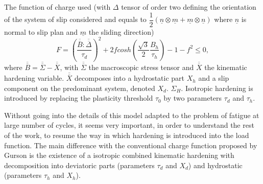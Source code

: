 The function of charge used (with $\Delta$ tensor of order two defining the orientation of the system of slip considered and equals to 
$\dfrac{1}{2}\left(\underline{n}\otimes\underline{m}+\underline{m}\otimes\underline{n} \right)  $ where $\underline{n}$ is normal to slip plan and $\underline{m}$ the sliding direction)
\begin{equation}
F=\left( \dfrac{\overline{\overline{B}}:\overline{\overline{\Delta}}}{\tau_d}\right) ^2+2fcosh\left(\dfrac{\sqrt{3}}{2}\dfrac{B_h}{\tau_h}\right)-1-f^2\leqslant 0 ,
\label{eq.monchiet1}
\end{equation}
where $\overline{\overline{B}}=\overline{\overline{\Sigma}}-\overline{\overline{X}}$, with $\overline{\overline{\Sigma}}$ the macroscopic stress tensor and $\overline{\overline{X}}$ the  kinematic hardening variable. $\overline{\overline{X}}$  decomposes into a hydrostatic part $X_h$ and a slip component on the predominant system, denoted $X_d$. $\Sigma_H$. Isotropic hardening is introduced by replacing the plasticity threshold $\tau_0$ by two parameters $\tau_d$ and $\tau_h$.

Without going into the details of this model adapted to the problem of fatigue at large number of cycles, it seems very important, in order to understand the rest of the work, to resume the way in which hardening is introduced into the load function. The main difference with the conventional charge function proposed by Gurson is the existence of a isotropic combined kinematic hardening with decomposition into deviatoric parts (parameters $\tau_d$ and $X_d$) and hydrostatic (parameters $\tau_h$ and $X_h$).

